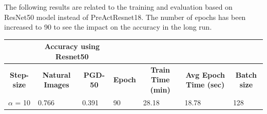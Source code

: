 \documentclass{article}
\begin{document}
The following results are related to the training and evaluation based on
ResNet50 model instead of PreActResnet18. The number of epochs has been
increased to 90 to see the impact on the accuracy in the long run. 

\begin{table}[hbt!]
\begin{tabular}{|c|c|l|l|l|l|l|}
\hline
\multicolumn{1}{|l|}{}    & \multicolumn{2}{c|}{\textbf{Accuracy using
Resnet50}}                               & \multicolumn{4}{l|}{\textbf{}}
\\ \hline
\textbf{Step-size}        & \textbf{Natural Images}                      &
\multicolumn{1}{c|}{\textbf{PGD-50}} & \multicolumn{1}{c|}{\textbf{Epoch}} &
\multicolumn{1}{c|}{\textbf{Train Time (min)}} & \multicolumn{1}{c|}{\textbf{Avg
Epoch Time (sec)}} & \multicolumn{1}{c|}{\textbf{Batch size}} \\ \hline
$\alpha$ = 10 & \multicolumn{1}{l|}{0.766} & { 0.391}         & { 90}
& { 28.18}                   & { 18.78}                       & { 128}
\\ \hline
\end{tabular}
\end{table}
\end{document}

